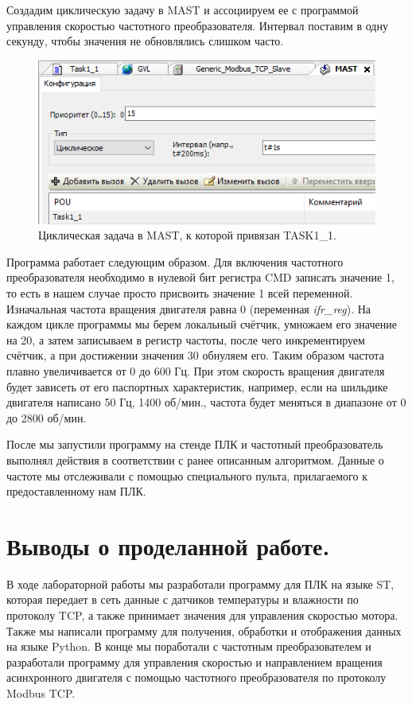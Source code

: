 \documentclass[a4paper, 12pt]{article}
\begin{document}
    Создадим циклическую задачу в MAST и ассоциируем ее с программой управления скоростью частотного преобразователя.
    Интервал поставим в одну секунду, чтобы значения не обновлялись слишком часто.
    \begin{figure}[H]
        \centering
        \includegraphics[scale=1.3]{cycl.png}
        \captionsetup{skip=0pt}
        \caption{Циклическая задача в MAST, к которой привязан TASK1\_{1}.}
        \label{fig:cycl}
    \end{figure}


    Программа работает следующим образом. Для включения
    частотного преобразователя необходимо в нулевой бит
    регистра CMD записать значение 1, то есть в нашем случае
    просто присвоить значение 1 всей переменной. Изначальная
    частота вращения двигателя равна 0 (переменная \textit{ifr\_{reg}}).
    На каждом цикле программы мы берем локальный счётчик,
    умножаем его значение на 20, а затем записываем в регистр
    частоты, после чего инкрементируем счётчик, а при
    достижении значения 30 обнуляем его. Таким образом частота
    плавно увеличивается от 0 до 600 Гц.
    При этом скорость вращения двигателя будет зависеть от его
    паспортных характеристик, например, если на шильдике
    двигателя написано 50 Гц, 1400 об/мин., частота будет меняться
    в диапазоне от 0 до 2800 об/мин.


    После мы запустили программу на стенде ПЛК и частотный преобразователь выполнял действия в
    соответствии с ранее описанным алгоритмом. Данные о частоте мы отслеживали с помощью специального
    пульта, прилагаемого к предоставленному нам ПЛК.


    \section{Выводы о проделанной работе.}
    В ходе лабораторной работы мы разработали программу для ПЛК на языке ST, которая передает в сеть данные с датчиков
    температуры и влажности по протоколу TCP, а также принимает значения для управления скоростью мотора. Также мы
    написали программу для получения, обработки и отображения данных на языке Python. В конце мы поработали с частотным
    преобразователем и разработали программу для управления скоростью и направлением вращения асинхронного двигателя
    с помощью частотного преобразователя по протоколу Modbus TCP.
\end{document}
